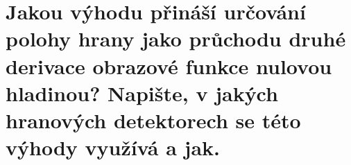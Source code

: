 \section{Jakou výhodu přináší určování polohy hrany jako průchodu druhé derivace obrazové funkce nulovou hladinou? 
Napište, v jakých hranových detektorech se této výhody využívá a jak.}